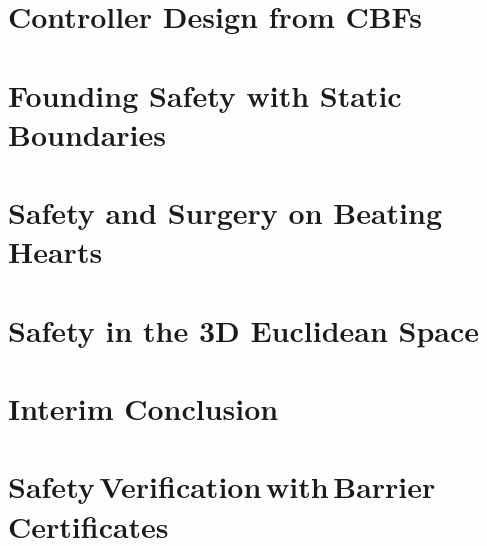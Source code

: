 \chapter{Controller Design from CBFs}\label{chap:cbf}
	
\chapter{Founding Safety with Static Boundaries}\label{chap:cbf_1d_static}


\chapter{Safety and Surgery on Beating Hearts} \label{chap:cbf_1d_dynamic}

\chapter{Safety in the 3D Euclidean Space}\label{chap:cbf_3d_static}

%
\chapter{Interim Conclusion}\label{chap:interim}


\chapter[Safety Verification with Barrier Certificates]{Safety\,Verification\,with\,Barrier\,Certificates}\label{chap:putinar}
	
